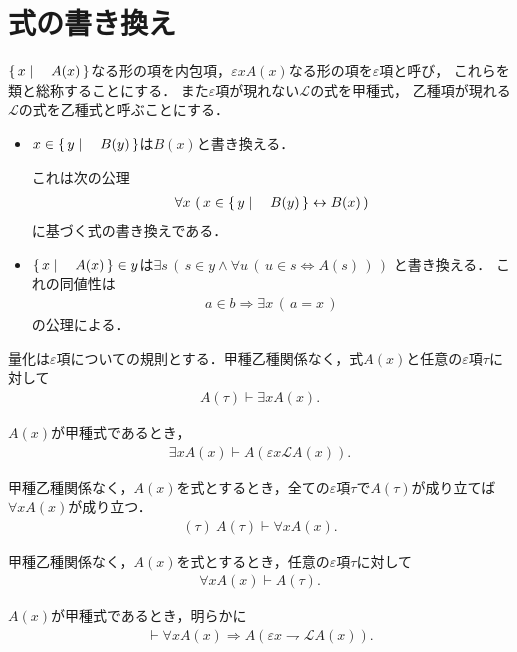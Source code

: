 \section{式の書き換え}
	$\left\{\, x \mid \quad A(x)\, \right\}$なる形の項を内包項，$\varepsilon x A(x)$なる形の項を$\varepsilon$項と呼び，
	これらを類と総称することにする．
	また$\varepsilon$項が現れない$\mathcal{L}$の式を甲種式，
	乙種項が現れる$\mathcal{L}$の式を乙種式と呼ぶことにする．
	
	\begin{itemize}
		\item $x \in \left\{\, y \mid \quad B(y)\, \right\}$は$B(x)$と書き換える．
			
			これは次の公理
			\begin{align}
				\forall x\, \left(\, x \in \left\{\, y \mid \quad B(y)\, \right\} \leftrightarrow B(x)\, \right)
			\end{align}
			に基づく式の書き換えである．
			
		\item $\left\{\, x \mid \quad A(x)\, \right\} \in y$は$\exists s\, \left(\, s \in y \wedge 
			\forall u\, (\, u \in s \Longleftrightarrow A(s)\, )\, \right)$
			と書き換える．
			これの同値性は
			\begin{align}
				a \in b \Longrightarrow \exists x\, (\, a = x\, )
			\end{align}
			の公理による．
			
	\end{itemize}
	
	量化は$\varepsilon$項についての規則とする．甲種乙種関係なく，式$A(x)$と任意の$\varepsilon$項$\tau$に対して
	\begin{align}
		A(\tau) \vdash \exists x A(x).
	\end{align}
	
	$A(x)$が甲種式であるとき，
	\begin{align}
		\exists x A(x) \vdash A\left(\varepsilon x \mathcal{L}A(x)\right).
	\end{align}
	
	甲種乙種関係なく，$A(x)$を式とするとき，全ての$\varepsilon$項$\tau$で$A(\tau)$が成り立てば$\forall x A(x)$が成り立つ．
	\begin{align}
		(\tau)\ A(\tau) \vdash \forall x A(x).
	\end{align}
	
	甲種乙種関係なく，$A(x)$を式とするとき，任意の$\varepsilon$項$\tau$に対して
	\begin{align}
		\forall x A(x) \vdash A(\tau).
	\end{align}
	
	$A(x)$が甲種式であるとき，明らかに
	\begin{align}
		\vdash \forall x A(x) \Longrightarrow A(\varepsilon x \rightharpoondown \mathcal{L}A(x)).
	\end{align}